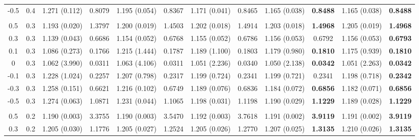 \documentclass[11pt]{article}
\newcommand{\tbf}{\textbf}
\begin{document}
\begin{table}
\begin{tabular}{c c|| c c | c c | c c | c c | c c}
        -0.5 & 0.4 
        & 1.271 (0.112) & 0.8079 & 1.195 (0.054) & 0.8367 & 1.171 (0.041) & 0.8465 & 1.165 (0.038) & \tbf{0.8488} & 1.165 (0.038) & \tbf{0.8488}
        \\ &&&&&&& \\

        0.5 & 0.3
        & 1.193 (0.020) & 1.3797 & 1.200 (0.019) & 1.4503 & 1.202 (0.018) & 1.4914 & 1.203 (0.018) & \textbf{1.4968} & 1.205 (0.019) & \textbf{1.4968}
        \\

        0.3 & 0.3
        & 1.139 (0.043) & 0.6686 & 1.154 (0.052) & 0.6768 & 1.155 (0.052) & 0.6786 & 1.156 (0.053) & 0.6792 & 1.156 (0.053) & \tbf{0.6793}
        \\

        0.1 & 0.3
        & 1.086 (0.273) & 0.1766 & 1.215 (1.444) & 0.1787 & 1.189 (1.100) & 0.1803 & 1.179 (0.980) & \tbf{0.1810} & 1.175 (0.939) & \tbf{0.1810}
        \\

        0 & 0.3 
        & 1.062 (3.990) & 0.0311 & 1.063 (4.106) & 0.0311 & 1.051 (2.236) & 0.0340 & 1.050 (2.138) & \tbf{0.0342} & 1.051 (2.263) & \textbf{0.0342}
        \\

        -0.1 & 0.3
        & 1.228 (1.024) & 0.2257 & 1.207 (0.798) & 0.2317 & 1.199 (0.724) & 0.2341 & 1.199 (0.721) & 0.2341 & 1.198 (0.718) & \tbf{0.2342}
        \\

        -0.3 & 0.3
        & 1.258 (0.151) & 0.6621 & 1.216 (0.102) & 0.6749 & 1.189 (0.076) & 0.6836 & 1.184 (0.072) & \tbf{0.6856} & 1.182 (0.071) & \tbf{0.6856}
        \\

        -0.5 & 0.3 
        & 1.274 (0.063) & 1.0871 & 1.231 (0.044) & 1.1065 & 1.198 (0.031) & 1.1198 & 1.190 (0.029) & \tbf{1.1229} & 1.189 (0.028) & \tbf{1.1229}
        \\ &&&&&&& \\

        0.5 & 0.2 
        & 1.190 (0.003) & 3.3755 & 1.190 (0.003) & 3.5470 & 1.192 (0.003) & 3.7618 & 1.191 (0.002) & \tbf{3.9119} & 1.191 (0.002) & \tbf{3.9119}
        \\

        0.3 & 0.2
        & 1.205 (0.030) & 1.1776 & 1.205 (0.027) & 1.2524 & 1.205 (0.026) & 1.2770 & 1.207 (0.025) & \tbf{1.3135} & 1.210 (0.026) & \tbf{1.3135}
        \\


\end{tabular}
\end{table}
\end{document}
